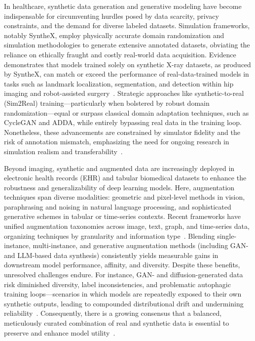 \documentclass[sigconf]{acmart}
\begin{document}
In healthcare, synthetic data generation and generative modeling have become indispensable for circumventing hurdles posed by data scarcity, privacy constraints, and the demand for diverse labeled datasets. Simulation frameworks, notably SyntheX, employ physically accurate domain randomization and simulation methodologies to generate extensive annotated datasets, obviating the reliance on ethically fraught and costly real-world data acquisition. Evidence demonstrates that models trained solely on synthetic X-ray datasets, as produced by SyntheX, can match or exceed the performance of real-data-trained models in tasks such as landmark localization, segmentation, and detection within hip imaging and robot-assisted surgery~\cite{ref65}. Strategic approaches like synthetic-to-real (Sim2Real) training---particularly when bolstered by robust domain randomization---equal or surpass classical domain adaptation techniques, such as CycleGAN and ADDA, while entirely bypassing real data in the training loop. Nonetheless, these advancements are constrained by simulator fidelity and the risk of annotation mismatch, emphasizing the need for ongoing research in simulation realism and transferability~\cite{ref65,ref75}.

Beyond imaging, synthetic and augmented data are increasingly deployed in electronic health records (EHR) and tabular biomedical datasets to enhance the robustness and generalizability of deep learning models. Here, augmentation techniques span diverse modalities: geometric and pixel-level methods in vision, paraphrasing and noising in natural language processing, and sophisticated generative schemes in tabular or time-series contexts. Recent frameworks have unified augmentation taxonomies across image, text, graph, and time-series data, organizing techniques by granularity and information type~\cite{ref62,ref63,ref64}. Blending single-instance, multi-instance, and generative augmentation methods (including GAN- and LLM-based data synthesis) consistently yields measurable gains in downstream model performance, affinity, and diversity. Despite these benefits, unresolved challenges endure. For instance, GAN- and diffusion-generated data risk diminished diversity, label inconsistencies, and problematic autophagic training loops---scenarios in which models are repeatedly exposed to their own synthetic outputs, leading to compounded distributional drift and undermining reliability~\cite{ref89,ref90}. Consequently, there is a growing consensus that a balanced, meticulously curated combination of real and synthetic data is essential to preserve and enhance model utility~\cite{ref89}.
\end{document}
